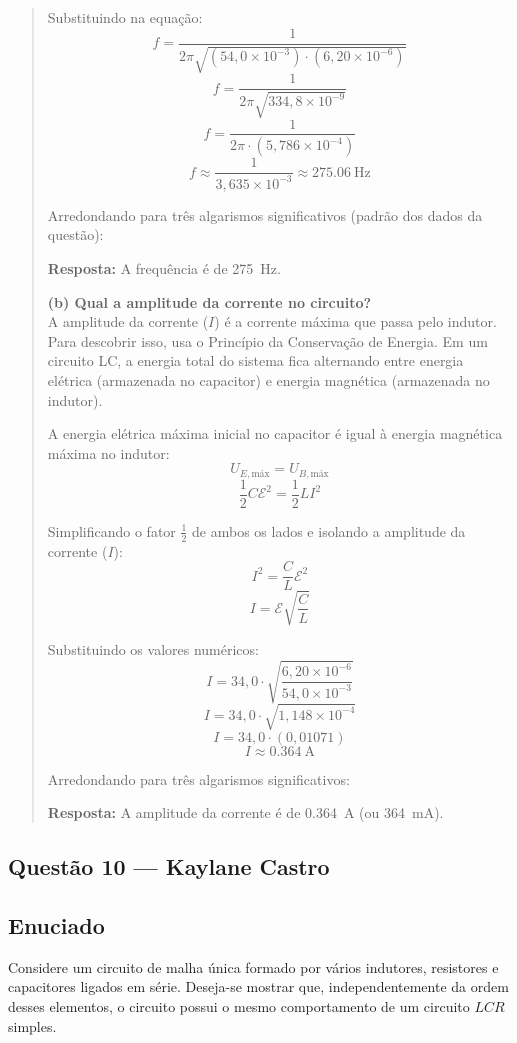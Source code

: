\documentclass[12pt,a4paper]{article}
\newcommand{\resposta}[1]{\noindent\textbf{Resposta:} #1}
\begin{document}
\begin{quote}
\noindent Substituindo na equação:
\[
f = \frac{1}{2\pi \sqrt{(54,0 \times 10^{-3}) \cdot (6,20 \times 10^{-6})}}
\]
\[
f = \frac{1}{2\pi \sqrt{334,8 \times 10^{-9}}}
\]
\[
f = \frac{1}{2\pi \cdot (5,786 \times 10^{-4})}
\]
\[
f \approx \frac{1}{3,635 \times 10^{-3}} \approx \SI{275,06}{\hertz}
\]

\noindent Arredondando para três algarismos significativos (padrão dos dados da questão):

\resposta{A frequência é de \SI{275}{\hertz}.}
\vspace{0.2cm}

\noindent \textbf{(b) Qual a amplitude da corrente no circuito?} \\
A amplitude da corrente ($I$) é a corrente máxima que passa pelo indutor. Para descobrir isso, usa o Princípio da Conservação de Energia. Em um circuito LC, a energia total do sistema fica alternando entre energia elétrica (armazenada no capacitor) e energia magnética (armazenada no indutor).

\vspace{0.2cm}
\noindent A energia elétrica máxima inicial no capacitor é igual à energia magnética máxima no indutor:
\[
U_{E,\text{máx}} = U_{B,\text{máx}}
\]
\[
\frac{1}{2} C \mathscr{E}^2 = \frac{1}{2} L I^2
\]

\noindent Simplificando o fator $\frac{1}{2}$ de ambos os lados e isolando a amplitude da corrente ($I$):
\[
I^2 = \frac{C}{L} \mathscr{E}^2
\]
\[
I = \mathscr{E} \sqrt{\frac{C}{L}}
\]

\noindent Substituindo os valores numéricos:
\[
I = 34,0 \cdot \sqrt{\frac{6,20 \times 10^{-6}}{54,0 \times 10^{-3}}}
\]
\[
I = 34,0 \cdot \sqrt{1,148 \times 10^{-4}}
\]
\[
I = 34,0 \cdot (0,01071)
\]
\[
I \approx \SI{0,364}{\ampere}
\]

\noindent Arredondando para três algarismos significativos:

\resposta{A amplitude da corrente é de \SI{0,364}{\ampere} (ou \SI{364}{\milli\ampere}).}
\end{quote}
\vspace{0.2cm}


\subsection{Questão 10 — Kaylane Castro}

\subsection*{Enuciado}
Considere um circuito de malha única formado por vários indutores, resistores e capacitores ligados em série. Deseja-se mostrar que, independentemente da ordem desses elementos, o circuito possui o mesmo comportamento de um circuito $LCR$ simples.
\end{document}
